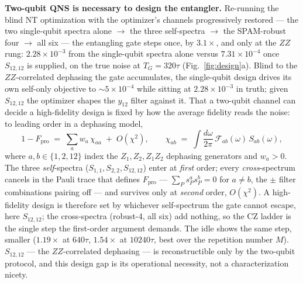 \documentclass[10pt]{article}
\newcommand{\TG}{T_G}
\begin{document}
\textbf{Two-qubit QNS is necessary to design the entangler.} Re-running the
blind NT optimization with the optimizer's channels progressively restored
--- the two single-qubit spectra alone $\to$ the three self-spectra $\to$
the SPAM-robust four $\to$ all six --- the entangling gate steps once, by
$3.1\times$, and only at the $ZZ$ rung: $2.28\times10^{-3}$ from the
single-qubit spectra alone versus $7.31\times10^{-4}$ once $S_{12,12}$ is
supplied, on the true noise at $\TG = 320\tau$ (Fig.~\ref{fig:design}a).
Blind to the $ZZ$-correlated dephasing the gate accumulates, the
single-qubit design drives its own self-only objective to $\sim
5\times10^{-4}$ while sitting at $2.28\times10^{-3}$ in truth; given
$S_{12,12}$ the optimizer shapes the $y_{12}$ filter against it. That a
two-qubit channel can decide a high-fidelity design is fixed by how the
average fidelity reads the noise: to leading order in a dephasing model,
\begin{equation}
  1-F_\mathrm{pro} \;=\; \sum_{a} w_a\,\chi_{aa} \;+\; O(\chi^2),
  \qquad
  \chi_{ab} \;=\; \int\!\frac{d\omega}{2\pi}\,\mathcal{F}_{ab}(\omega)\,S_{ab}(\omega),
  \label{eq:budget}
\end{equation}
where $a,b\in\{1,2,12\}$ index the $Z_1, Z_2, Z_1Z_2$ dephasing generators
and $w_a>0$. The three \emph{self}-spectra ($S_{1,1}, S_{2,2}, S_{12,12}$)
enter at \emph{first} order; every \emph{cross}-spectrum cancels in the
Pauli trace that defines $F_\mathrm{pro}$ --- $\sum_P s_P^a s_P^b = 0$ for
$a\neq b$, the $\pm$ filter combinations pairing off --- and survives only
at \emph{second} order, $O(\chi^2)$. A high-fidelity design is therefore set
by whichever self-spectrum the gate cannot escape, here $S_{12,12}$; the
cross-spectra (robust-4, all six) add nothing, so the CZ ladder is the
single step the first-order argument demands. The idle shows the same step,
smaller ($1.19\times$ at $640\tau$, $1.54\times$ at $10240\tau$, best over
the repetition number $M$). $S_{12,12}$ --- the $ZZ$-correlated dephasing
--- is reconstructible only by the two-qubit protocol, and this design gap
is its operational necessity, not a characterization nicety.
\end{document}
